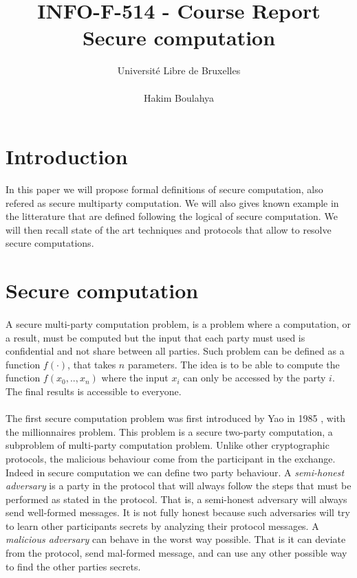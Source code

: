 \documentclass[11pt,a4paper]{article}
\title{INFO-F-514 -     Course Report \\
Secure computation}
\author{Université Libre de Bruxelles \\
\\ Hakim Boulahya}
\begin{document}
\maketitle


\section{Introduction}

In this paper we will propose formal definitions of secure
computation, also refered as secure multiparty computation.
We will also gives known example in the litterature
that are defined following the logical of secure computation.
We will then recall
state of the art techniques and protocols that allow
to resolve secure computations.

\section{Secure computation}

\paragraph{}

A secure multi-party computation problem, is a problem where a computation,
or a result, must be computed but the input that each party must used
is confidential and not share between all parties. Such problem
can be defined as a function $f(\cdot)$, that takes $n$ parameters.
The idea is to be able to compute the function $f(x_0, .., x_n)$
where the input $x_i$ can only be accessed by the party $i$.
The final results is accessible to everyone.

\paragraph{}

The first secure computation problem was first introduced by
Yao in 1985 \cite{yao_protocols_1982}, with the millionnaires problem.
This problem is a secure two-party computation, a subproblem
of multi-party computation problem. Unlike other cryptographic
protocols, the malicious behaviour come from the
participant in the exchange. Indeed in secure computation
we can define two party behaviour. A \textit{semi-honest adversary}
is a party in the protocol that will always follow the steps
that must be performed as stated in the protocol. That is, a semi-honest
adversary will always send well-formed messages. It is not
fully honest because such adversaries will try to learn other
participants secrets by analyzing their protocol messages.
A \textit{malicious adversary} can behave in the worst way possible.
That is it can deviate from the protocol, send mal-formed message,
and can use any other possible way to find the other parties secrets.
\end{document}
